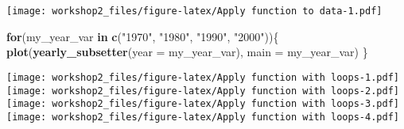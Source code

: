 \documentclass[
]{article}
\newenvironment{Shaded}{\begin{snugshade}}{\end{snugshade}}
\newcommand{\AttributeTok}[1]{\textcolor[rgb]{0.13,0.29,0.53}{#1}}
\newcommand{\ControlFlowTok}[1]{\textcolor[rgb]{0.13,0.29,0.53}{\textbf{#1}}}
\newcommand{\FunctionTok}[1]{\textcolor[rgb]{0.13,0.29,0.53}{\textbf{#1}}}
\newcommand{\NormalTok}[1]{#1}
\newcommand{\StringTok}[1]{\textcolor[rgb]{0.31,0.60,0.02}{#1}}
\begin{document}
\texttt{[image: workshop2\_files/figure-latex/Apply function to data-1.pdf]}

\begin{Shaded}
\begin{Highlighting}[]
\ControlFlowTok{for}\NormalTok{(my\_year\_var }\ControlFlowTok{in} \FunctionTok{c}\NormalTok{(}\StringTok{"1970"}\NormalTok{, }\StringTok{"1980"}\NormalTok{, }\StringTok{"1990"}\NormalTok{, }\StringTok{"2000"}\NormalTok{))\{}
  \FunctionTok{plot}\NormalTok{(}\FunctionTok{yearly\_subsetter}\NormalTok{(}\AttributeTok{year =}\NormalTok{ my\_year\_var), }\AttributeTok{main =}\NormalTok{ my\_year\_var)}
\NormalTok{\}}
\end{Highlighting}
\end{Shaded}

\texttt{[image: workshop2\_files/figure-latex/Apply function with loops-1.pdf]}
\texttt{[image: workshop2\_files/figure-latex/Apply function with loops-2.pdf]}
\texttt{[image: workshop2\_files/figure-latex/Apply function with loops-3.pdf]}
\texttt{[image: workshop2\_files/figure-latex/Apply function with loops-4.pdf]}
\end{document}

